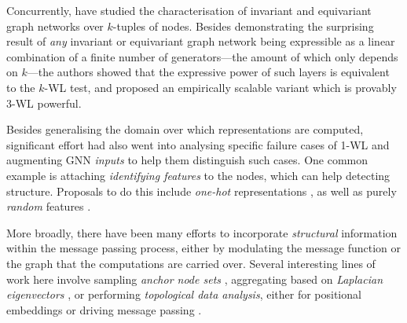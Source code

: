Concurrently, \citet{maron2018invariant,maron2019provably} have studied the characterisation of invariant and equivariant graph networks over $k$-tuples of nodes. Besides demonstrating the surprising result of \emph{any} invariant or equivariant graph network being expressible as a linear combination of a finite number of generators---the amount of which only depends on $k$---the authors showed that the expressive power of such layers is equivalent to the $k$-WL test, and proposed an empirically scalable variant which is provably 3-WL powerful.

Besides generalising the domain over which representations are computed, significant effort had also went into analysing specific failure cases of 1-WL and augmenting GNN \emph{inputs} to help them distinguish such cases. One common example is attaching \emph{identifying features} to the nodes, which can help detecting structure. Proposals to do this include \emph{one-hot} representations \citep{murphy2019relational}, as well as purely \emph{random} features \citep{sato2020random}.

More broadly, there have been many efforts to incorporate \emph{structural} information within the message passing process, either by modulating the message function or the graph that the computations are carried over. Several interesting lines of work here involve sampling \emph{anchor node sets} \citep{you2019position}, aggregating based on \emph{Laplacian eigenvectors} \citep{stachenfeld2020graph,beaini2020directional,dwivedi2020generalization}, or performing \emph{topological data analysis}, either for positional embeddings \citep{bouritsas2020improving} or driving message passing \citep{bodnar2021weisfeiler}.

 

